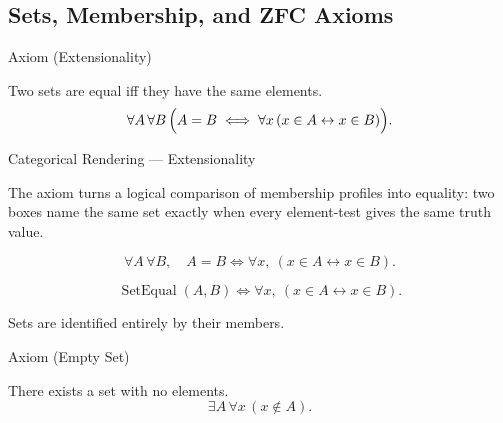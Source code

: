 
\subsection{Sets, Membership, and ZFC Axioms}

\begin{axiombox}{Axiom (Extensionality)}
\begin{axiom}
\label{ax:extensionality}
Two sets are equal iff they have the same elements.
\[
\forall A \, \forall B \,
\Bigl( A = B \iff \forall x \, (x \in A \leftrightarrow x \in B) \Bigr).
\]
\end{axiom}
\end{axiombox}

\begin{lracategoricalcard}{Categorical Rendering --- Extensionality}
\begin{center}

\end{center}
\smallskip
\noindent\footnotesize
The axiom turns a logical comparison of membership profiles into equality:
two boxes name the same set exactly when every element-test gives the same
truth value.
\end{lracategoricalcard}

\begin{remark*}
\[
  \forall A\,\forall B,\quad
  A=B \iff \forall x,\ (x\in A\leftrightarrow x\in B).
\]
\end{remark*}

\begin{remark*}
\[
  \operatorname{SetEqual}(A,B)
  \iff
  \forall x,\ (x\in A\leftrightarrow x\in B).
\]
\end{remark*}

\begin{remark*}[Interpretation]
Sets are identified entirely by their members.
\end{remark*}

\NoLocalDependencies

\begin{axiombox}{Axiom (Empty Set)}
\begin{axiom}
\label{ax:empty-set}
There exists a set with no elements.
\[
\exists A \, \forall x \, (x \notin A).
\]
\end{axiom}
\end{axiombox}

